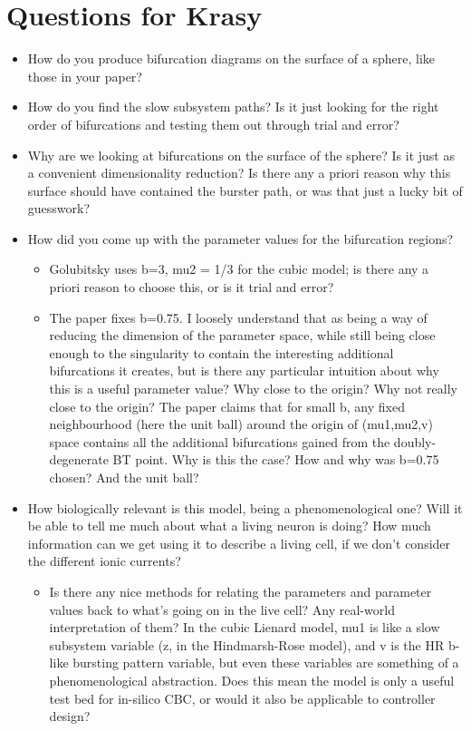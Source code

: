 \documentclass[11pt]{article}
\author{mark}
\date{\today}
\title{}
\begin{document}
\tableofcontents

\newpage

\section{Questions for Krasy}
\label{sec:org20574ed}
\begin{itemize}
\item How do you produce bifurcation diagrams on the surface of a sphere, like those in your paper?

\item How do you find the slow subsystem paths? Is it just looking for the right order of bifurcations and testing them out through trial and error?

\item Why are we looking at bifurcations on the surface of the sphere? Is it just as a convenient dimensionality reduction? Is there any a priori reason why this surface should have contained the burster path, or was that just a lucky bit of guesswork?

\item How did you come up with the parameter values for the bifurcation regions?
\begin{itemize}
\item Golubitsky uses b=3, mu2 = 1/3 for the cubic model; is there any a priori reason to choose this, or is it trial and error?
\item The paper fixes b=0.75. I loosely understand that as being a way of reducing the dimension of the parameter space, while still being close enough to the singularity to contain the interesting additional bifurcations it creates, but is there any particular intuition about why this is a useful parameter value? Why close to the origin? Why not really close to the origin? The paper claims that for small b, any fixed neighbourhood (here the unit ball) around the origin of (mu1,mu2,v) space contains all the additional bifurcations gained from the doubly-degenerate BT point. Why is this the case? How and why was b=0.75 chosen? And the unit ball?
\end{itemize}

\item How biologically relevant is this model, being a phenomenological one? Will it be able to tell me much about what a living neuron is doing? How much information can we get using it to describe a living cell, if we don't consider the different ionic currents?
\begin{itemize}
\item Is there any nice methods for relating the parameters and parameter values back to what's going on in the live cell? Any real-world interpretation of them? In the cubic Lienard model, mu1 is like a slow subsystem variable (z, in the Hindmarsh-Rose model), and v is the HR b-like bursting pattern variable, but even these variables are something of a phenomenological abstraction. Does this mean the model is only a useful test bed for in-silico CBC, or would it also be applicable to controller design?
\end{itemize}
\end{itemize}
\end{document}
